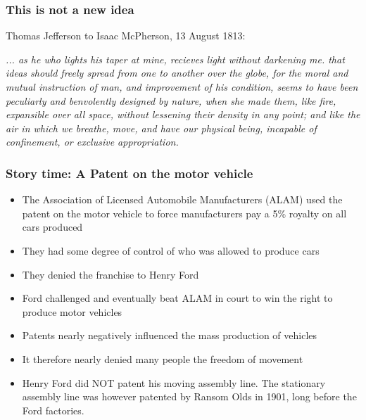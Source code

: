 \documentclass{beamer}
\begin{document}
\begin{frame}
\frametitle{This is not a new idea}

\begin{center}

Thomas Jefferson to Isaac McPherson, 13 August 1813:

\emph{... as he who lights his taper at mine, recieves light without darkening me. that ideas should freely spread from one to another over the globe, for the moral and mutual instruction of man, and improvement of his condition, seems to have been peculiarly and benvolently designed by nature, when she made them, like fire, expansible over all space, without lessening their density in any point; and like the air in which we breathe, move, and have our physical being, incapable of confinement, or exclusive appropriation. }

\end{center}
\end{frame}


\begin{frame}
\frametitle{Story time:  A Patent on the motor vehicle}

\begin{itemize}
\item The Association of Licensed Automobile Manufacturers (ALAM) used the patent on the motor vehicle to force manufacturers pay a 5\% royalty on all cars produced
\item They had some degree of control of who was allowed to produce cars
\item They denied the franchise to Henry Ford
\item Ford challenged and eventually beat ALAM in court to win the right to produce motor vehicles
\item Patents nearly negatively influenced the mass production of vehicles
\item It therefore nearly denied many people the freedom of movement
\item Henry Ford did NOT patent his moving assembly line.  The stationary assembly line was however patented by Ransom Olds in 1901, long before the Ford factories.
\end{itemize}

\end{frame}
\end{document}
